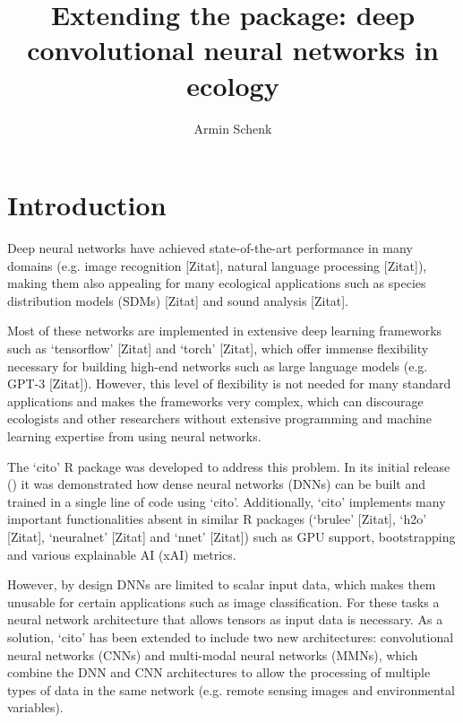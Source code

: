 \documentclass{article}
\author{Armin Schenk}
\title{Extending the \pkg{cito} package: deep convolutional neural networks in ecology}
\newcommand{\pkg}[1]{`#1'}
\begin{document}
\maketitle

\begin{abstract} 
\end{abstract}

\newpage
\tableofcontents
\newpage
{}
\setcounter{page}{1}
\section{Introduction}
Deep neural networks have achieved state-of-the-art performance in many domains (e.g. image recognition [Zitat], natural language processing [Zitat]), making them also appealing for many ecological applications such as species distribution models (SDMs) [Zitat] and sound analysis [Zitat].

Most of these networks are implemented in extensive deep learning frameworks such as \pkg{tensorflow} [Zitat] and \pkg{torch} [Zitat], which offer immense flexibility necessary for building high-end networks such as large language models (e.g. GPT-3 [Zitat]). However, this level of flexibility is not needed for many standard applications and makes the frameworks very complex, which can discourage ecologists and other researchers without extensive programming and machine learning expertise from using neural networks.

The \pkg{cito} R package was developed to address this problem. In its initial release (\cite{amesoderCitoPackageTraining2024}) it was demonstrated how dense neural networks (DNNs) can be built and trained in a single line of code using \pkg{cito}. Additionally, \pkg{cito} implements many important functionalities absent in similar R packages (\pkg{brulee} [Zitat], \pkg{h2o} [Zitat], \pkg{neuralnet} [Zitat] and \pkg{nnet} [Zitat]) such as GPU support, bootstrapping and various explainable AI (xAI) metrics.

However, by design DNNs are limited to scalar input data, which makes them unusable for certain applications such as image classification. For these tasks a neural network architecture that allows tensors as input data is necessary.
As a solution, \pkg{cito} has been extended to include two new architectures: convolutional neural networks (CNNs) and multi-modal neural networks (MMNs), which combine the DNN and CNN architectures to allow the processing of multiple types of data in the same network (e.g. remote sensing images and environmental variables).
\end{document}

